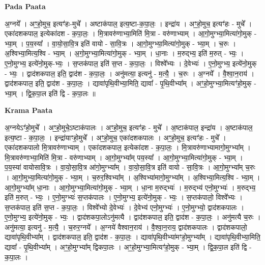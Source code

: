 \documentclass[17pt]{extarticle}
\begin{document}
\textbf{Pada Paata} \newline

अ॒ग्नये᳚ । अꣳ॒॒हो॒मुच॒ इत्यꣳ॑हः-मुचे᳚ । अष्टाक॑पाल॒ इत्य॒ष्टा-क॒पा॒लः॒ । इन्द्रा॑य । अꣳ॒॒हो॒मुच॒ इत्यꣳ॑हः - मुचे᳚ । एका॑दशकपाल॒ इत्येका॑दश - क॒पा॒लः॒ । मि॒त्रावरु॑णाभ्या॒मिति॑ मि॒त्रा - वरु॑णाभ्याम् । आ॒गो॒मुग्भ्या॒मित्या॑गो॒मुक् - भ्या॒म् । प॒य॒स्या᳚ । वा॒यो॒सा॒वि॒त्र इति॑ वायो - सा॒वि॒त्रः । आ॒गो॒मुग्भ्या॒मित्या॑गो॒मुक् - भ्या॒म् । च॒रुः । अ॒श्विभ्या॒मित्य॒श्वि - भ्या॒म् । अ॒गो॒मुग्भ्या॒मित्या॑गो॒मुक् - भ्या॒म् । धा॒नाः । म॒रुद्भ्य॒ इति॑ म॒रुत् - भ्यः॒ । ए॒नो॒मुग्भ्य॒ इत्ये॑नो॒मुक्-भ्यः॒ । स॒प्तक॑पाल॒ इति॑ स॒प्त - क॒पा॒लः॒ । विश्वे᳚भ्यः । दे॒वेभ्यः॑ । ए॒नो॒मुग्भ्य॒ इत्ये॑नो॒मुक् - भ्यः॒ । द्वाद॑शकपाल॒ इति॒ द्वाद॑श - क॒पा॒लः॒ । अनु॑मत्या॒ इत्यनु॑ - म॒त्यै॒ । च॒रुः । अ॒ग्नये᳚ । वै॒श्वा॒न॒राय॑ । द्वाद॑शकपाल॒ इति॒ द्वाद॑श - क॒पा॒लः॒ । द्यावा॑पृथि॒वीभ्या॒मिति॒ द्यावा᳚ - पृ॒थि॒वीभ्या᳚म् । अꣳ॒॒हो॒मुग्भ्या॒मित्यꣳ॑हो॒मुक् - भ्या॒म् । द्वि॒क॒पा॒ल इति॑ द्वि - क॒पा॒लः ॥  \newline


\textbf{Krama Paata} \newline

अ॒ग्नयेऽꣳ॑हो॒मुचे᳚ । अꣳ॒॒हो॒मुचे॒ऽष्टाक॑पालः । अꣳ॒॒हो॒मुच॒ इत्यꣳ॑हः - मुचे᳚ । अ॒ष्टाक॑पाल॒ इन्द्रा॑य । अ॒ष्टाक॑पाल॒ इत्य॒ष्टा - क॒पा॒लः॒ । इन्द्रा॑याꣳहो॒मुचे᳚ । अꣳ॒॒हो॒मुच॒ एका॑दशकपालः । अꣳ॒॒हो॒मुच॒ इत्यꣳ॑हः - मुचे᳚ । एका॑दशकपालो मि॒त्रावरु॑णाभ्याम् । एका॑दशकपाल॒ इत्येका॑दश - क॒पा॒लः॒ । मि॒त्रावरु॑णाभ्यामागो॒मुग्भ्या᳚म् । मि॒त्रावरु॑णाभ्या॒मिति॑ मि॒त्रा - वरु॑णाभ्याम् । आ॒गो॒मुग्भ्या᳚म् पय॒स्या᳚ । आ॒गो॒मुग्भ्या॒मित्या॑गो॒मुक् - भ्या॒म् । प॒य॒स्या॑ वायोसावि॒त्रः । वा॒यो॒सा॒वि॒त्र आ॑गो॒मुग्भ्या᳚म् । वा॒यो॒सा॒वि॒त्र इति॑ वायो - सा॒वि॒त्रः । आ॒गो॒मुग्भ्या᳚म् च॒रुः । आ॒गो॒मुभ्या॒मित्या॑गो॒मुक् - भ्या॒म् । च॒रुर॒श्विभ्या᳚म् । अ॒श्विभ्या॑मागो॒मुग्भ्या᳚म् । अ॒श्विभ्या॒मित्य॒श्वि - भ्या॒म् । आ॒गो॒मुग्भ्या᳚म् धा॒नाः । आ॒गो॒मुग्भ्या॒मित्या॑गो॒मुक् - भ्या॒म् । धा॒ना म॒रुद्भ्यः॑ । म॒रुद्भ्य॑ एनो॒मुग्भ्यः॑ । म॒रुद्भ्य॒ इति॑ म॒रुत् - भ्यः॒ । ए॒नो॒मुग्भ्यः॑ स॒प्तक॑पालः । ए॒नो॒मुग्भ्य॒ इत्ये॑नो॒मुक् - भ्यः॒ । स॒प्तक॑पालो॒ विश्वे᳚भ्यः । स॒प्तक॑पाल॒ इति॑ स॒प्त - क॒पा॒लः॒ । विश्वे᳚भ्यो दे॒वेभ्यः॑ । दे॒वेभ्य॑ एनो॒मुग्भ्यः॑ । ए॒नो॒मुग्भ्यो॒ द्वाद॑शकपालः । ए॒नो॒मुग्भ्य॒ इत्ये॑नो॒मुक् - भ्यः॒ । द्वाद॑शकपा॒लोऽनु॑मत्यै । द्वाद॑शकपाल॒ इति॒ द्वाद॑श - क॒पा॒लः॒ । अनु॑मत्यै च॒रुः । अनु॑मत्या॒ इत्यनु॑ - म॒त्यै॒ । च॒रुर॒ग्नये᳚ । अ॒ग्नये॑ वैश्वान॒राय॑ । वै॒श्वा॒न॒राय॒ द्वाद॑शकपालः । द्वाद॑शकपालो॒ द्यावा॑पृथि॒वीभ्या᳚म् । द्वाद॑शकपाल॒ इति॒ द्वाद॑श - क॒पा॒लः॒ । द्यावा॑पृथि॒वीभ्या॑मꣳहो॒मुग्भ्या᳚म् । द्यावा॑पृथि॒वीभ्या॒मिति॒ द्यावा᳚ - पृ॒थि॒वीभ्या᳚म् । अꣳ॒॒हो॒मुग्भ्या᳚म् द्विकपा॒लः । 
अꣳ॒॒हो॒मुग्भ्या॒मित्यꣳ॑हो॒मुक् - भ्या॒म् । द्वि॒क॒पा॒ल इति॑ द्वि - क॒पा॒लः । \newline
\end{document}
